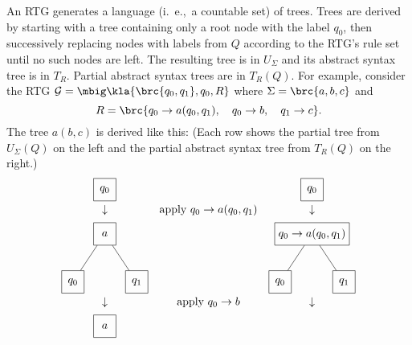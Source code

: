 An RTG generates a language (i.~e.,~a countable set) of trees. Trees are
derived by starting with a tree containing only a root node with the label
$q_0$, then successively replacing nodes with labels from $Q$ according to the
RTG's rule set until no such nodes are left. The resulting tree is in
$U_\Sigma$ and its abstract syntax tree is in $T_R$. Partial abstract syntax
trees are in $T_R(Q)$.  For example, consider the RTG $\ug =
\mbig\kla{\brc{q_0,q_1},q_0,R}$ where $\Sigma=\brc{a,b,c}$ and
\[
 R = \brc{ q_0 \to a(q_0,q_1), \quad q_0 \to b, \quad q_1 \to c }.
\]
The tree $a(b,c)$ is derived like this: (Each row shows the partial tree from
$U_\Sigma(Q)$ on the left and the partial abstract syntax tree from $T_R(Q)$ on
the right.)
\[\begin{matrix}
 \begin{tikzpicture}[every node/.style={rectangle,draw,minimum size=2em},baseline=(current bounding box.center)]
  \node (n) at (0,0) { $q_0$ };
 \end{tikzpicture}
 &&
 \begin{tikzpicture}[every node/.style={rectangle,draw,minimum size=2em},baseline=(current bounding box.center)]
  \node (n) at (0,0) { $q_0$ };
 \end{tikzpicture}
 \\\\[-1em]
 \downarrow & \text{apply } q_0\to a(q_0,q_1) & \downarrow \\[0.5em]
 \begin{tikzpicture}[every node/.style={rectangle,draw,minimum size=2em},baseline=(current bounding box.center)]
  \node (n) at (0,0) { $a$ };
  \node (n1) at (-1,-1.5) { $q_0$ } edge (n);
  \node (n2) at (+1,-1.5) { $q_1$ } edge (n);
 \end{tikzpicture}
 &\hspace*{4em}&
 \begin{tikzpicture}[every node/.style={rectangle,draw,minimum size=2em},baseline=(current bounding box.center)]
  \node (n) at (0,0) { $q_0 \to a(q_0,q_1)$ };
  \node (n1) at (-1,-1.5) { $q_0$ } edge (n);
  \node (n2) at (+1,-1.5) { $q_1$ } edge (n);
 \end{tikzpicture}
 \\\\[-1em]
 \downarrow & \text{apply } q_0\to b & \downarrow \\[0.5em]
 \begin{tikzpicture}[every node/.style={rectangle,draw,minimum size=2em},baseline=(current bounding box.center)]
  \node (n) at (0,0) { $a$ };

\end{tikzpicture}
\end{matrix}\]
